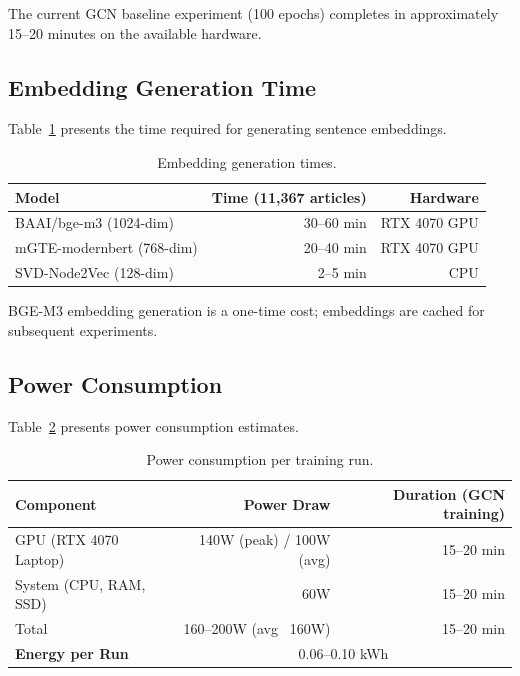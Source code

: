 The current GCN baseline experiment (100 epochs) completes in approximately 15--20 minutes on the available hardware.

\subsection{Embedding Generation Time}

Table~\ref{tab:embedding-time} presents the time required for generating sentence embeddings.

\begin{table}[htbp]
\centering
\caption{Embedding generation times.}
\label{tab:embedding-time}
\begin{tabular}{lrr}
\toprule
\textbf{Model} & \textbf{Time (11,367 articles)} & \textbf{Hardware} \\
\midrule
BAAI/bge-m3 (1024-dim) & 30--60 min & RTX 4070 GPU \\
mGTE-modernbert (768-dim) & 20--40 min & RTX 4070 GPU \\
SVD-Node2Vec (128-dim) & 2--5 min & CPU \\
\bottomrule
\end{tabular}
\end{table}

BGE-M3 embedding generation is a one-time cost; embeddings are cached for subsequent experiments.

\subsection{Power Consumption}

Table~\ref{tab:power-consumption} presents power consumption estimates.

\begin{table}[htbp]
\centering
\caption{Power consumption per training run.}
\label{tab:power-consumption}
\begin{tabular}{lrr}
\toprule
\textbf{Component} & \textbf{Power Draw} & \textbf{Duration (GCN training)} \\
\midrule
GPU (RTX 4070 Laptop) & 140W (peak) / 100W (avg) & 15--20 min \\
System (CPU, RAM, SSD) & 60W & 15--20 min \\
Total & 160--200W (avg ~160W) & 15--20 min \\
\midrule
\textbf{Energy per Run} & \multicolumn{2}{c}{0.06--0.10 kWh} \\
\bottomrule
\end{tabular}
\end{table}

